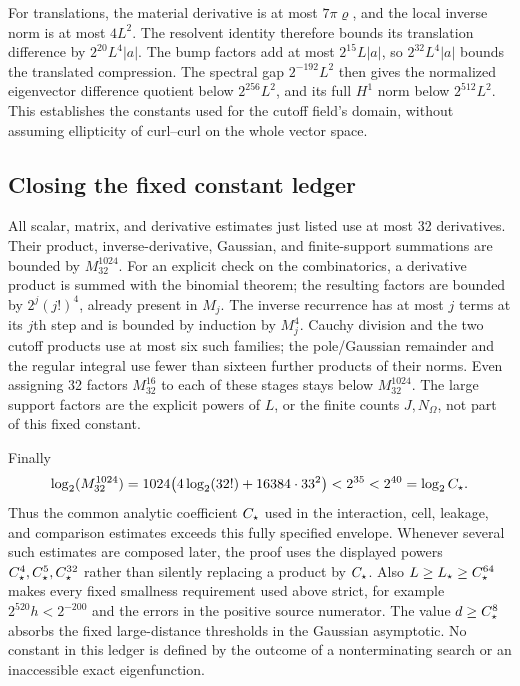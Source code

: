 For translations, the material derivative is at most $7\pi\varrho$,
and the local inverse norm is at most $4L^2$. The resolvent identity
therefore bounds its translation difference by $2^{20}L^4|a|$.
The bump factors add at most $2^{15}L|a|$, so $2^{32}L^4|a|$
bounds the translated compression. The spectral gap
$2^{-192}L^2$ then gives the normalized eigenvector difference
quotient below $2^{256}L^2$, and its full $H^1$ norm below
$2^{512}L^2$. This establishes the constants used for the cutoff
field's domain, without assuming ellipticity of curl--curl on the
whole vector space.

\subsection{Closing the fixed constant ledger}
All scalar, matrix, and derivative estimates just listed use at most
32 derivatives. Their product, inverse-derivative, Gaussian, and
finite-support summations are bounded by $M_{32}^{1024}$.
For an explicit check on the combinatorics, a derivative product is
summed with the binomial theorem; the resulting factors are bounded
by $2^j(j!)^4$, already present in $M_j$. The inverse recurrence
has at most $j$ terms at its $j$th step and is bounded by induction
by $M_j^4$. Cauchy division and the two cutoff products use at most
six such families; the pole/Gaussian remainder and the regular
integral use fewer than sixteen further products of their norms.
Even assigning 32 factors $M_{32}^{16}$ to each of these stages
stays below $M_{32}^{1024}$. The large support factors are the
explicit powers of $L$, or the finite counts $J,N_\Omega$, not
part of this fixed constant.

Finally
\[
 \log_2(M_{32}^{1024})
 =1024\bigl(4\log_2(32!)+16384\cdot33^2\bigr)
 <2^{35}<2^{40}=\log_2C_\star.
\]
Thus the common analytic coefficient $C_\star$ used in the interaction,
cell, leakage, and comparison estimates exceeds this fully specified
envelope. Whenever several such estimates are composed later, the
proof uses the displayed powers $C_\star^4,C_\star^5,C_\star^{32}$ rather
than silently replacing a product by $C_\star$.
Also $L\ge L_\star\ge C_\star^{64}$ makes every fixed smallness requirement
used above strict, for example $2^{520}h<2^{-200}$ and the errors
in the positive source numerator. The value $d\ge C_\star^8$ absorbs
the fixed large-distance thresholds in the Gaussian asymptotic.
No constant in this ledger is defined by the outcome of a
nonterminating search or an inaccessible exact eigenfunction.
